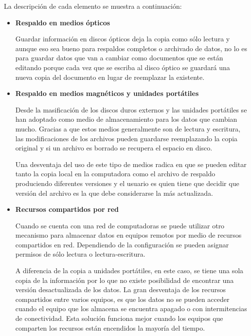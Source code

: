 La descripci\'{o}n de cada elemento se muestra a continuaci\'{o}n:

    \begin{itemize}
    
      \item \textbf{Respaldo en medios \'{opticos}}

Guardar informaci\'{o}n en discos \'{o}pticos deja la copia como s\'{o}lo lectura y aunque eso sea bueno para respaldos completos o archivado de datos, no lo es para guardar datos que van a cambiar como documentos que se est\'{a}n editando porque cada vez que se escriba al disco \'{o}ptico se guardar\'{a} una nueva copia del documento en lugar de reemplazar la existente.

      \item \textbf{Respaldo en medios magn\'{e}ticos y unidades port\'{a}tiles}

Desde la masificaci\'{o}n de los discos duros externos y las unidades port\'{a}tiles se han adoptado como medio de almacenamiento para los datos que cambian mucho. Gracias a que estos medios generalmente son de lectura y escritura, las modificaciones de los archivos pueden guardarse reemplazando la copia original y si un archivo es borrado se recupera el espacio en disco.

Una desventaja del uso de este tipo de medios radica en que se pueden editar tanto la copia local en la computadora como el archivo de respaldo produciendo diferentes versiones y el usuario es quien tiene que decidir que versi\'{o}n del archivo es la que debe considerarse la m\'{a}s actualizada.

      \item \textbf{Recursos compartidos por red}

Cuando se cuenta con una red de computadoras se puede utilizar otro mecanismo para almacenar datos en equipos remotos por medio de recursos compartidos en red. Dependiendo de la configuraci\'{o}n se pueden asignar permisos de s\'{o}lo lectura o lectura-escritura.

A diferencia de la copia a unidades port\'{a}tiles, en este caso, se tiene una sola copia de la informaci\'{o}n por lo que no existe posibilidad de encontrar una versi\'{o}n desactualizada de los datos. La gran desventaja de los recursos compartidos entre varios equipos, es que los datos no se pueden acceder cuando el equipo que los almacena se encuentra apagado o con intermitencias de conectividad. Esta soluci\'{o}n funciona mejor cuando los equipos que comparten los recursos est\'{a}n encendidos la mayor\'{i}a del tiempo.


\end{itemize}
